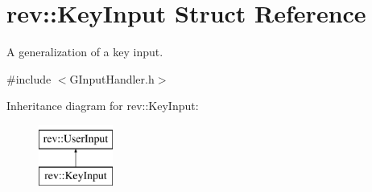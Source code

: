 \hypertarget{structrev_1_1_key_input}{}\section{rev\+::Key\+Input Struct Reference}
\label{structrev_1_1_key_input}


A generalization of a key input.  




{\ttfamily \#include $<$G\+Input\+Handler.\+h$>$}

Inheritance diagram for rev\+::Key\+Input\+:\begin{figure}[H]
\begin{center}
\leavevmode
\includegraphics[height=2.000000cm]{structrev_1_1_key_input}
\end{center}
\end{figure}
